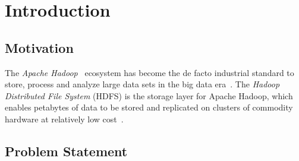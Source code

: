 
%
%
%


\chapter{Introduction}
\label{ch:Introduction}

%




\section{Motivation}

The \textit{Apache Hadoop}~\cite{apachehadoop} ecosystem has become the de facto industrial standard to store, process and analyze large data sets in the big data era~\cite{cloudera}. The \textit{Hadoop Distributed File System} (HDFS) is the storage layer for Apache Hadoop, which enables petabytes of data to be stored and replicated on clusters of commodity hardware at relatively low cost~\cite{borthakur2008hdfs}.


\section{Problem Statement}

